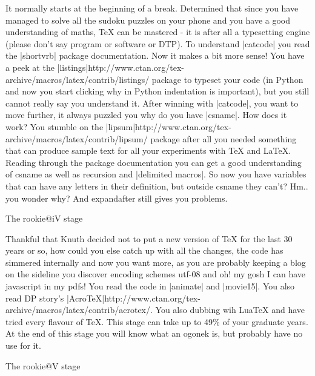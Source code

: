 It normally starts at the beginning of a break. Determined that since you have managed to solve all the sudoku puzzles on your phone and you have a good understanding of maths, TeX can be mastered - it is after all a typesetting engine (please don't say program or software or DTP). To  understand |catcode| you read the |shortvrb| package documentation. Now it makes a bit more sense! You have a peek at the |listings|http://www.ctan.org/tex-archive/macros/latex/contrib/listings/ package to typeset your code (in Python and now you start clicking why in Python indentation is important), but you still cannot really say you understand it. After winning with |catcode|, you want to move further, it always puzzled you why do you have |csname|. How does it work? You stumble on the |lipsum|http://www.ctan.org/tex-archive/macros/latex/contrib/lipsum/ package after all you needed something that can produce sample text for all your experiments with TeX and LaTeX. Reading through the package documentation you can get a good understanding of csname as well as recursion and |delimited macros|.  So now you have variables that can have any letters in their definition, but outside csname they can't? Hm.. you wonder why? And expandafter still gives you problems.


The rookie@iV stage

Thankful that Knuth decided not to put a new version of TeX for the last 30 years or so, how could you else catch up with all the changes, the code has simmered internally and now you want more, as you are probably keeping a blog on the sideline you discover encoding schemes utf-08 and oh! my gosh I can have javascript in my pdfs! You read the code in |animate| and |movie15|. You also read DP story's |AcroTeX|http://www.ctan.org/tex-archive/macros/latex/contrib/acrotex/. You also dubbing wih LuaTeX and have tried every flavour of TeX. This stage can take up to 49\% of your graduate years. At the end of this stage you will know what an ogonek is, but probably have no use for it.

The rookie@V stage


